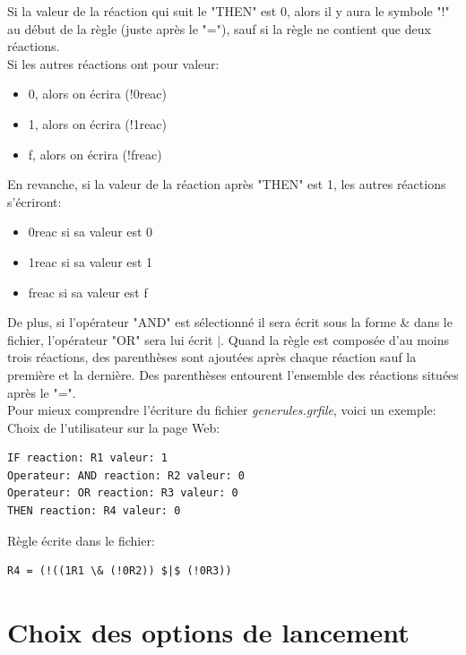 Si la valeur de la réaction qui suit le "THEN" est 0, alors il y aura le symbole "!" au début de la règle (juste après le "="), sauf si la règle ne contient que deux réactions.\\
Si les autres réactions ont pour valeur:
\begin{itemize}
\item 0, alors on écrira (!0reac)
\item 1, alors on écrira (!1reac)
\item f, alors on écrira (!freac)
\end{itemize}
En revanche, si la valeur de la réaction après "THEN" est 1, les autres réactions s'écriront:
\begin{itemize}
\item 0reac si sa valeur est 0
\item 1reac si sa valeur est 1
\item freac si sa valeur est f
\end{itemize}
De plus, si l'opérateur "AND" est sélectionné il sera écrit sous la forme \& dans le fichier, l'opérateur "OR" sera lui écrit $|$. Quand la règle est composée d'au moins trois réactions, des parenthèses sont ajoutées après chaque réaction sauf la première et la dernière. Des parenthèses entourent l'ensemble des réactions situées après le "=".\\

Pour mieux comprendre l'écriture du fichier \emph{generules.grfile}, voici un exemple:\\

Choix de l'utilisateur sur la page Web: \\
\begin{DDbox}{\linewidth}
\begin{lstlisting}
IF reaction: R1 valeur: 1
Operateur: AND reaction: R2 valeur: 0
Operateur: OR reaction: R3 valeur: 0
THEN reaction: R4 valeur: 0
\end{lstlisting}
\end{DDbox}

Règle écrite dans le fichier: \\
\begin{DDbox}{\linewidth}
\begin{lstlisting}
R4 = (!((1R1 \& (!0R2)) $|$ (!0R3))
\end{lstlisting}
\end{DDbox}

\section{Choix des options de lancement}

